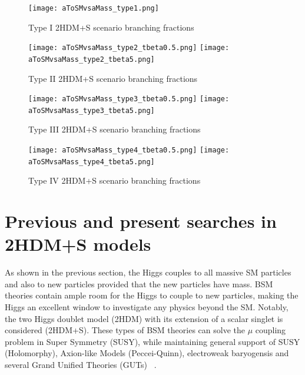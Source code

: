 \begin{figure}[ht!b]
  \centering
\texttt{[image: aToSMvsaMass\_type1.png]}           \\
    \caption{\label{fig:br2HDM-1} Type I 2HDM+S scenario branching fractions ~\cite{Branco_2012}}
\end{figure}

\begin{figure}[ht!b]
  \centering
\texttt{[image: aToSMvsaMass\_type2\_tbeta0.5.png]}
\texttt{[image: aToSMvsaMass\_type2\_tbeta5.png]}           \\
    \caption{\label{fig:br2HDM-2} Type II 2HDM+S scenario branching fractions ~\cite{Branco_2012}}
\end{figure}

\begin{figure}[ht!b]
  \centering
\texttt{[image: aToSMvsaMass\_type3\_tbeta0.5.png]}
\texttt{[image: aToSMvsaMass\_type3\_tbeta5.png]}           \\
    \caption{\label{fig:br2HDM-3} Type III 2HDM+S scenario branching fractions ~\cite{Branco_2012}}
\end{figure}



\begin{figure}[ht!b]
  \centering
\texttt{[image: aToSMvsaMass\_type4\_tbeta0.5.png]}
\texttt{[image: aToSMvsaMass\_type4\_tbeta5.png]}           \\
    \caption{\label{fig:br2HDM-4} Type IV 2HDM+S scenario branching fractions ~\cite{Branco_2012}}
\end{figure}

\section{Previous and present searches in 2HDM+S models}

As shown in the previous section, the Higgs couples to all massive SM particles and also to new particles provided that the new particles have mass.  
BSM theories contain ample room for the Higgs to couple to new particles, making the Higgs an excellent window to investigate any physics beyond the SM.
Notably, the two Higgs doublet model (2HDM) with its extension of a scalar singlet is considered (2HDM+S).
These types of BSM theories can solve the $\mu$ coupling problem in Super Symmetry (SUSY), while maintaining general support of SUSY (Holomorphy), Axion-like Models (Peccei-Quinn), electroweak baryogensis and several Grand Unified Theories (GUTs) ~\cite{Branco_2012}.

